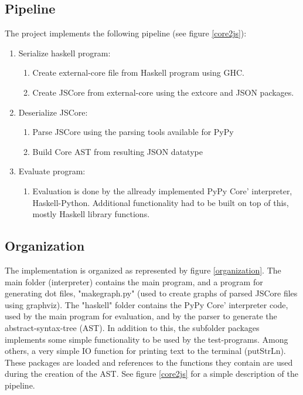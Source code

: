 \subsection{Pipeline}

The project implements the following pipeline (see figure \ref{core2js}):
\begin{enumerate}
\item Serialize haskell program: 
  \begin{enumerate}
  \item Create external-core file from Haskell program using GHC.
  \item Create JSCore from external-core using the extcore and JSON packages.
  \end{enumerate}
\item Deserialize JSCore:
  \begin{enumerate}
  \item Parse JSCore using the parsing tools available for PyPy
  \item Build Core AST from resulting JSON datatype
  \end{enumerate}
\item Evaluate program:
  \begin{enumerate}
  \item Evaluation is done by the allready implemented PyPy Core' interpreter,
  Haskell-Python. Additional functionality had to be built on top of this, mostly 
  Haskell library functions.
  \end {enumerate}
\end{enumerate}

\subsection{Organization}

The implementation is organized as represented by figure \ref{organization}. The
main folder (interpreter) contains the main program, and a program for generating
dot files, "makegraph.py" (used to create graphs of parsed JSCore files using graphviz). 
The "haskell" folder
contains the PyPy Core' interpreter code, used by the main program for evaluation, 
and by the parser to generate the abstract-syntax-tree (AST). In addition to this,
the subfolder packages implements some simple functionality to be used by the test-programs.
Among others, a very simple IO function for printing text to the terminal (putStrLn).
These packages are loaded and references to the functions they contain are used during
the creation of the AST. See figure \ref{core2js} for a simple description of the pipeline.

